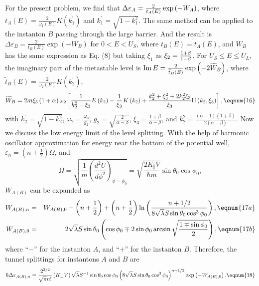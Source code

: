 For the present problem, we find that $\Delta \varepsilon _A=\frac 2{%
t_A\left( E\right) }\exp \left( -W_A\right) $, where $t_A\left( E\right) =%
\frac 2{\omega _1\left( E\right) }K\left( k_1^{\prime }\right) $ and $%
k_1^{\prime }=\sqrt{1-k_1^2}$. The same method can be applied to the
instanton $B$ passing through the large barrier. And the result is $\Delta
\varepsilon _B=\frac 2{t_B\left( E\right) }\exp \left( -W_B\right) $ for $%
0<E<U_S$, where $t_B\left( E\right) =t_A\left( E\right) $, and $W_B$ has the
same expression as Eq. (8) but taking $\xi _1$ as $\xi _2=\frac{1+\beta }{%
1-\beta }$. For $U_S\leq E\leq U_L$, the imaginary part of the metastable
level is $%
\mathop{\rm Im}%
E=\frac 2{\widetilde{t}_B\left( E\right) }\exp \left( -2\widetilde{W}%
_B\right) $, where $\widetilde{t}_B\left( E\right) =\frac 2{\omega _2\left(
E\right) }K\left( k_2^{\prime }\right) $, 
\begin{equation}
\widetilde{W}_B=2m\xi _3\left( 1+\alpha \right) \omega _2\left[ \frac 1{%
k_2^2-\xi _3}E\left( k_2\right) -\frac 1{\xi _3}K\left( k_2\right) +\frac{%
k_2^2+\xi _3^2+2k_2^2\xi _3}{\xi _3}\Pi \left( k_2,\xi _3\right) \right] , 
\eqnum{16}
\end{equation}
with $k_2^{\prime }=\sqrt{1-k_2^2}$, $\omega _2=\frac{\omega _0}{g_2}$, $g_2=%
\sqrt{\frac 2{\alpha -\beta }}$, $\xi _3=\frac{1+\beta }{\alpha -\beta }$,
and $k_2^2=\frac{\left( \alpha -1\right) \left( 1+\beta \right) }{2\left(
\alpha -\beta \right) }$. Now we discuss the low energy limit of the level
splitting. With the help of harmonic oscillator approximation for energy
near the bottom of the potential well, $\varepsilon _n=\left( n+\frac 12%
\right) \Omega $, and 
\[
\Omega =\sqrt{\frac 1m\left( \frac{d^2U}{d\phi ^2}\right) _{\phi =\phi _0}}=%
\sqrt{\frac{2K_{\Vert }V}{\hbar m}}\sin \theta _0\cos \phi _0,
\]
$W_{A\left( B\right) }$ can be expanded as 
\begin{eqnarray}
W_{A\left( B\right) ,n} &=&W_{A\left( B\right) ,0}-\left( n+\frac 12\right)
+\left( n+\frac 12\right) \ln \left( \frac{n+1/2}{8\sqrt{\lambda }S\sin
\theta _0\cos ^3\phi _0}\right) ,  \eqnum{17a} \\
W_{A\left( B\right) ,0} &=&2\sqrt{\lambda }S\sin \theta _0\left( \cos \phi
_0\mp 2\sin \phi _0\arcsin \sqrt{\frac{1\mp \sin \phi _0}2}\right) , 
\eqnum{17b}
\end{eqnarray}
where ``$-$'' for the instanton $A$, and ``$+$'' for the instanton $B$.
Therefore, the tunnel splittings for instantons $A$ and $B$ are 
\begin{equation}
\hbar \Delta \varepsilon _{A\left( B\right) ,n}=\frac{2^{3/2}}{\sqrt{\pi }n!}%
\left( K_{\bot }V\right) \sqrt{\lambda }S^{-1}\sin \theta _0\cos \phi
_0\left( 8\sqrt{\lambda }S\sin \theta _0\cos ^3\phi _0\right) ^{n+1/2}\exp
\left( -W_{A\left( B\right) ,0}\right) .  \eqnum{18}
\end{equation}
